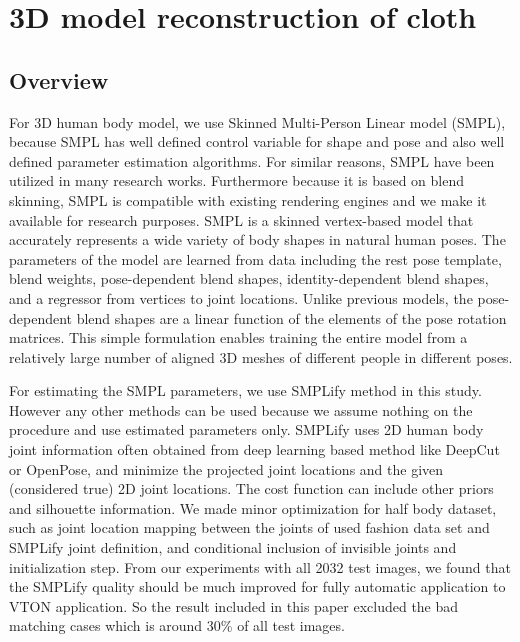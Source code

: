 \section{3D model reconstruction of cloth} \label{section:3dclothrecon}

\subsection{Overview} 

For 3D human body model, we use Skinned Multi-Person Linear model (SMPL)\cite{Loper2015SMPLAS}, because SMPL has well defined control variable for shape and pose and also well defined parameter estimation  algorithms. For similar reasons, SMPL have been utilized in many research works. Furthermore because it is based on blend skinning, SMPL is compatible with existing rendering engines and we make it available for research purposes. SMPL is a skinned vertex-based model that accurately represents a wide variety of body shapes in natural human poses. The parameters of the model are learned from data including the rest pose template, blend weights, pose-dependent blend shapes, identity-dependent blend shapes, and a regressor from vertices to joint locations. Unlike previous models, the pose-dependent blend shapes are a linear function of the elements of the pose rotation matrices. This simple formulation enables training the entire model from a relatively large number of aligned 3D meshes of different people in different poses. \cite{Loper2015SMPLAS} 


For estimating the SMPL parameters, we use SMPLify\cite{Bogo2016SMPLify} method in this study. However any other methods can be used because we assume nothing on the procedure and use estimated parameters only. SMPLify uses 2D human body joint information often obtained from deep learning based method like DeepCut or OpenPose, and minimize the projected joint locations and the given (considered true) 2D joint locations. The cost function can include other priors and silhouette information. We made minor optimization for half body dataset, such as joint location mapping between the joints of used fashion data set and SMPLify joint definition, and conditional inclusion of invisible joints and initialization step.  From our experiments with all 2032 test images, we found that the SMPLify quality should be much improved for fully automatic application to VTON application. So the result included in this paper excluded the bad matching cases which is around 30\% of all test images.    
  
